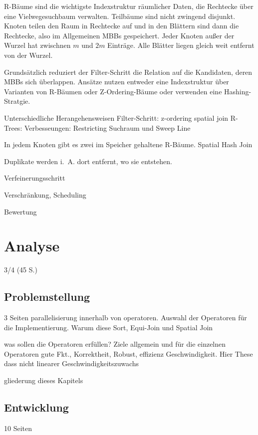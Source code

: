 \documentclass[a4paper,12pt,twoside]{article}
\begin{document}
R-Bäume sind die wichtigste Indexstruktur räumlicher Daten, die Rechtecke über eine Vielwegesuchbaum verwalten. Teilbäume sind nicht zwingend disjunkt. Knoten teilen den Raum in Rechtecke auf und in den Blättern sind dann die Rechtecke, also im Allgemeinen MBBs gespeichert. Jeder Knoten außer der Wurzel hat zwischnen $m$ und $2 m$ Einträge. Alle Blätter liegen gleich weit entfernt von der Wurzel.

Grundsätzlich reduziert der Filter-Schritt die Relation auf die Kandidaten, deren MBBs sich überlappen. Ansätze nutzen entweder eine Indexstruktur über Varianten von R-Bäumen oder Z-Ordering-Bäume oder verwenden eine Hashing-Stratgie.

 

Unterschiedliche Herangehensweisen Filter-Schritt:
z-ordering spatial join
R-Trees: Verbesseungen: Restricting Suchraum und Sweep Line


 In jedem Knoten gibt es zwei im Speicher gehaltene R-Bäume.{}
Spatial Hash Join

Duplikate werden i.~A. dort entfernt, wo sie entstehen.{}{}


Verfeinerungsschritt

Verschränkung, Scheduling



Bewertung



\section{Analyse}
3/4 (45 S.)

\subsection{Problemstellung} 3 Seiten
parallelisierung innerhalb von operatoren. Auswahl der Operatoren für die Implementierung. Warum diese Sort, Equi-Join und Spatial Join

was sollen die Operatoren erfüllen?
Ziele allgemein und für die einzelnen Operatoren
gute Fkt., Korrektheit, Robust, effizienz
Geschwindigkeit. Hier These dass nicht linearer Geschwindigkeitszuwachs

gliederung dieses Kapitels

\subsection{Entwicklung} 10 Seiten
\end{document}
